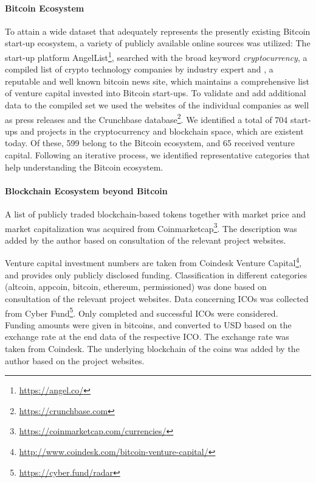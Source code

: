 \paragraph{Bitcoin Ecosystem}

To attain a wide dataset that adequately 
represents the presently existing Bitcoin start-up ecosystem, a variety of publicly available online sources was utilized: The start-up platform AngelList\footnote{\url{https://angel.co/}}, 
searched with the broad keyword \emph{cryptocurrency}, a compiled list of crypto technology 
companies by industry expert \cite{Mougayar2015} and \cite{Coindesk2015}, a reputable 
and well known bitcoin news site, which maintains a comprehensive list of venture 
capital invested into Bitcoin start-ups. To validate and add additional data to 
the compiled set we used the websites of the individual companies as well as press 
releases and the Crunchbase database\footnote{\url{https://crunchbase.com}}. We identified a total of 704 start-ups 
and projects in the cryptocurrency and blockchain space, which are existent today. 
Of these, 599 belong to the Bitcoin ecosystem, and 65 received venture capital. 
Following an iterative process, we identified representative categories that help 
understanding the Bitcoin ecosystem. 

\paragraph{Blockchain Ecosystem beyond Bitcoin}
A list of publicly traded blockchain-based tokens together with market price and market capitalization was acquired from Coinmarketcap\footnote{\url{https://coinmarketcap.com/currencies/}}. The description was added by the author based on consultation of the relevant project websites. 

Venture capital investment numbers are taken from Coindesk Venture Capital\footnote{\url{http://www.coindesk.com/bitcoin-venture-capital/}}, and provides only publicly disclosed funding. Classification in different categories (altcoin, appcoin, bitcoin, ethereum, permissioned) was done based on consultation of the relevant project websites. Data concerning \ac{ICO}s was collected from Cyber Fund\footnote{\url{https://cyber.fund/radar}}. Only completed and successful \ac{ICO}s were considered. Funding amounts were given in bitcoins, and converted to USD based on the exchange rate at the end data of the respective \ac{ICO}. The exchange rate was taken from Coindesk. The underlying blockchain of the coins was added by the author based on the project websites.

